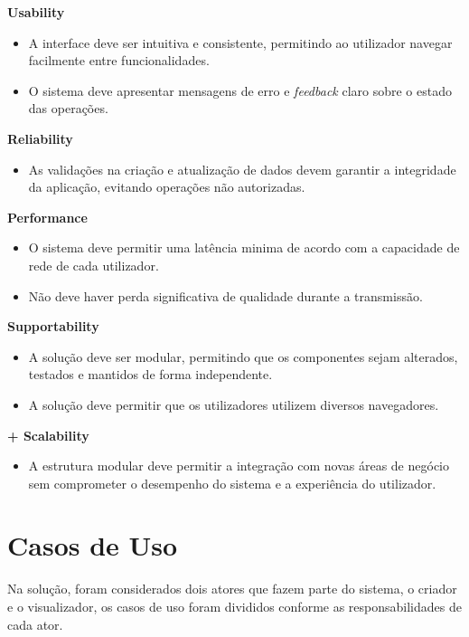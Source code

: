 \noindent\textbf{Usability}
\begin{itemize}
  \item A interface deve ser intuitiva e consistente, permitindo ao utilizador navegar facilmente entre funcionalidades.
  \item O sistema deve apresentar mensagens de erro e \textit{feedback} claro sobre o estado das operações.
\end{itemize}

\noindent\textbf{Reliability}
\begin{itemize}
  \item As validações na criação e atualização de dados devem garantir a integridade da aplicação, evitando operações não autorizadas.
\end{itemize}

\noindent\textbf{Performance}
\begin{itemize}
  \item O sistema deve permitir uma latência minima de acordo com a capacidade de rede de cada utilizador.
  \item Não deve haver perda significativa de qualidade durante a transmissão.
\end{itemize}

\noindent\textbf{Supportability}
\begin{itemize}
  \item A solução deve ser modular, permitindo que os componentes sejam alterados, testados e mantidos de forma independente.
  \item A solução deve permitir que os utilizadores utilizem diversos navegadores.
\end{itemize}

\noindent\textbf{+ Scalability}
\begin{itemize}
  \item A estrutura modular deve permitir a integração com novas áreas de negócio sem comprometer o desempenho do sistema e a experiência do utilizador.
\end{itemize}




\section{Casos de Uso}

Na solução, foram considerados dois atores que fazem parte do sistema, o criador e o visualizador, os casos de uso foram divididos conforme as responsabilidades de cada ator.

